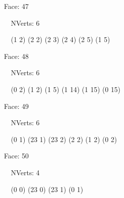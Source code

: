 \documentclass{article}
\begin{document}
{\footnotesize 

Face: 47

\   \    NVerts: 6

 \   \   (1 2) (2 2) (2 3) (2 4) (2 5) (1 5)}

{\footnotesize 

Face: 48

\   \    NVerts: 6

 \   \   (0 2) (1 2) (1 5) (1 14) (1 15) (0 15)}

{\footnotesize 

Face: 49

\   \    NVerts: 6

 \   \   (0 1) (23 1) (23 2) (2 2) (1 2) (0 2)}

{\footnotesize 

Face: 50

\   \    NVerts: 4

 \   \   (0 0) (23 0) (23 1) (0 1)}


 \newpage
\end{document}
